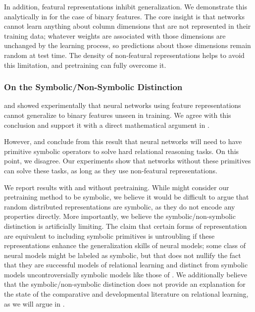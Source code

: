 \documentclass[9pt,twocolumn,twoside,lineno]{pnas-new}
\begin{document}
{In addition, featural representations inhibit generalization. We demonstrate this analytically in  for the case of binary features. The core insight is that networks cannot learn anything about column dimensions that are not represented in their training data; whatever weights are associated with those dimensions are unchanged by the learning process, so predictions about those dimensions remain random at test time. The density of non-featural representations helps to avoid this limitation, and pretraining can fully overcome it.

\subsubsection{On the Symbolic/Non-Symbolic Distinction}

\citet{marcus:1999} and \citet{marcus:2001} showed experimentally that neural networks using feature representations cannot generalize to binary features unseen in training. We agree with this conclusion and support it with a direct mathematical argument in .

However, \citeauthor{marcus:1999} and \citeauthor{marcus:2001} conclude from this result that neural networks will need to have primitive symbolic operators to solve hard relational reasoning tasks. On this point, we disagree. Our experiments show that networks without these primitives can solve these tasks, as long as they use non-featural representations.

We report results with and without pretraining. While \citeauthor{marcus:2001} might consider our pretraining method to be symbolic, we believe it would be difficult to argue that random distributed representations are symbolic, as they do not encode any properties directly. More importantly, we believe the symbolic/non-symbolic distinction is artificially limiting. The claim that certain forms of representation are equivalent to including symbolic primitives is untroubling if these representations enhance the generalization skills of neural models; some class of neural models might be labeled as symbolic, but that does not nullify the fact that they are successful models of relational learning and distinct from symbolic models uncontroversially symbolic models like those of \citealt{frank:2011}. We additionally believe that the symbolic/non-symbolic distinction does not provide an explanation for the state of the comparative and developmental literature on relational learning, as we will argue in .}
\end{document}
